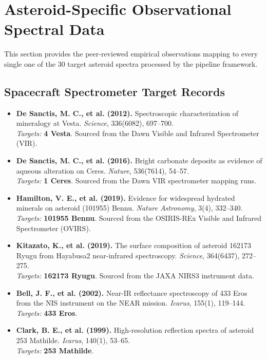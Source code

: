 \documentclass[11pt,letterpaper]{article}
\begin{document}
\section{Asteroid-Specific Observational Spectral Data}
This section provides the peer-reviewed empirical observations mapping to every single one of the 30 target asteroid spectra processed by the pipeline framework.

\subsection{Spacecraft Spectrometer Target Records}
\begin{itemize}
    \item \textbf{De Sanctis, M. C., et al. (2012).} Spectroscopic characterization of mineralogy at Vesta. \textit{Science}, 336(6082), 697--700. \\
    \textit{Targets:} \textbf{4 Vesta}. Sourced from the Dawn Visible and Infrared Spectrometer (VIR).
    
    \item \textbf{De Sanctis, M. C., et al. (2016).} Bright carbonate deposits as evidence of aqueous alteration on Ceres. \textit{Nature}, 536(7614), 54--57. \\
    \textit{Targets:} \textbf{1 Ceres}. Sourced from the Dawn VIR spectrometer mapping runs.
    
    \item \textbf{Hamilton, V. E., et al. (2019).} Evidence for widespread hydrated minerals on asteroid (101955) Bennu. \textit{Nature Astronomy}, 3(4), 332--340. \\
    \textit{Targets:} \textbf{101955 Bennu}. Sourced from the OSIRIS-REx Visible and Infrared Spectrometer (OVIRS).
    
    \item \textbf{Kitazato, K., et al. (2019).} The surface composition of asteroid 162173 Ryugu from Hayabusa2 near-infrared spectroscopy. \textit{Science}, 364(6437), 272--275. \\
    \textit{Targets:} \textbf{162173 Ryugu}. Sourced from the JAXA NIRS3 instrument data.
    
    \item \textbf{Bell, J. F., et al. (2002).} Near-IR reflectance spectroscopy of 433 Eros from the NIS instrument on the NEAR mission. \textit{Icarus}, 155(1), 119--144. \\
    \textit{Targets:} \textbf{433 Eros}.
    
    \item \textbf{Clark, B. E., et al. (1999).} High-resolution reflection spectra of asteroid 253 Mathilde. \textit{Icarus}, 140(1), 53--65. \\
    \textit{Targets:} \textbf{253 Mathilde}.
    

\end{itemize}
\end{document}
